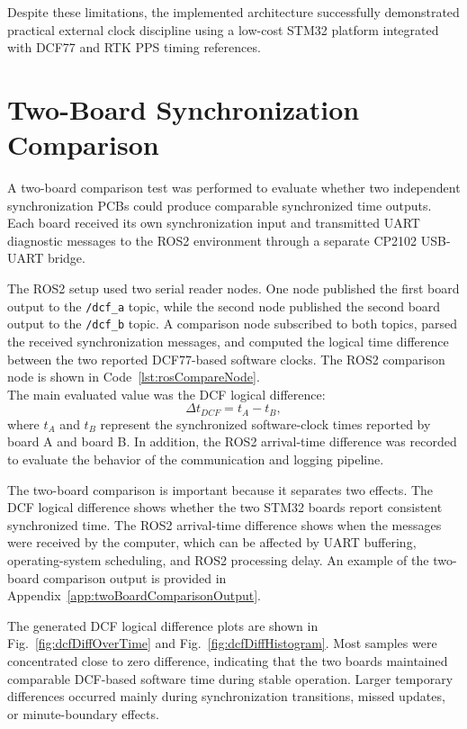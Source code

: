 Despite these limitations, the implemented architecture successfully demonstrated practical external clock discipline using a low-cost STM32 platform integrated with DCF77 and RTK PPS timing references.

\section{Two-Board Synchronization Comparison}

A two-board comparison test was performed to evaluate whether two independent synchronization PCBs could produce comparable synchronized time outputs. Each board received its own synchronization input and transmitted UART diagnostic messages to the ROS2 environment through a separate CP2102 USB-UART bridge.

The ROS2 setup used two serial reader nodes. One node published the first board output to the \texttt{/dcf\_a} topic, while the second node published the second board output to the \texttt{/dcf\_b} topic. A comparison node subscribed to both topics, parsed the received synchronization messages, and computed the logical time difference between the two reported DCF77-based software clocks. The ROS2 comparison node is shown in Code~\ref{lst:rosCompareNode}.
\\
The main evaluated value was the DCF logical difference:
\begin{equation}
\Delta t_{DCF} = t_{A} - t_{B},
\end{equation}
where $t_A$ and $t_B$ represent the synchronized software-clock times reported by board A and board B. In addition, the ROS2 arrival-time difference was recorded to evaluate the behavior of the communication and logging pipeline.

The two-board comparison is important because it separates two effects. The DCF logical difference shows whether the two STM32 boards report consistent synchronized time. The ROS2 arrival-time difference shows when the messages were received by the computer, which can be affected by UART buffering, operating-system scheduling, and ROS2 processing delay. An example of the two-board comparison output is provided in Appendix~\ref{app:twoBoardComparisonOutput}.

The generated DCF logical difference plots are shown in Fig.~\ref{fig:dcfDiffOverTime} and Fig.~\ref{fig:dcfDiffHistogram}. Most samples were concentrated close to zero difference, indicating that the two boards maintained comparable DCF-based software time during stable operation. Larger temporary differences occurred mainly during synchronization transitions, missed updates, or minute-boundary effects.

